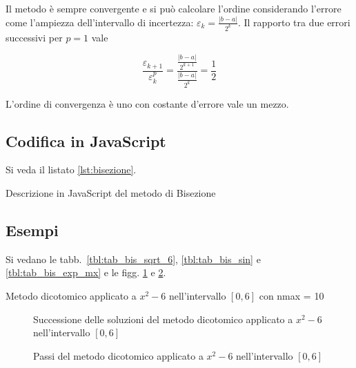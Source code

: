 Il metodo è sempre convergente e si può calcolare l'ordine considerando l'errore
come l'ampiezza dell'intervallo di incertezza: $\varepsilon_k = \frac{|b - a|}{2^k}$.
Il rapporto tra due errori successivi per $p=1$ vale

$$\displaystyle \frac{\varepsilon_{k+1}}{\varepsilon_{k}^p}
=\frac{
    \frac{|b - a|}{2^{k+1}}
  }{
      \frac{|b - a|}{2^k}
  }
  = \frac{1}{2}$$

L'ordine di convergenza è uno con costante d'errore vale un mezzo.

\subsection{Codifica in JavaScript}

Si veda il listato \ref{lst:bisezione}.

\begin{lstfloat}
    
    \caption{Descrizione in JavaScript del metodo di Bisezione}
    \label{lst:bisezione}
\end{lstfloat}

\subsection{Esempi}

Si vedano le tabb.~\ref{tbl:tab_bis_sqrt_6}, \ref{tbl:tab_bis_sin} e \ref{tbl:tab_bis_exp_mx} e le figg. \ref{fig:bis_sqrt_6} e \ref{fig:subplots_bis_sqrt_6}.

\begin{table}[!htbp]
    \begin{center}
\end{center}        
\caption[]{Metodo dicotomico applicato a $x^2 -6$ nell'intervallo $[0, 6]$ con nmax = 10}
\label{tbl:tab_bis_sqrt_6}
\end{table}

\begin{figure}[!htbp]
    \centering
    
    \caption{Successione delle soluzioni del metodo dicotomico applicato a $x^2 -6$ nell'intervallo $[0, 6]$}
    \label{fig:bis_sqrt_6}
\end{figure}

\begin{figure}[!htbp]
    \centering
    
    \caption{Passi del metodo dicotomico applicato a $x^2 -6$ nell'intervallo $[0, 6]$}
    \label{fig:subplots_bis_sqrt_6}
\end{figure}


